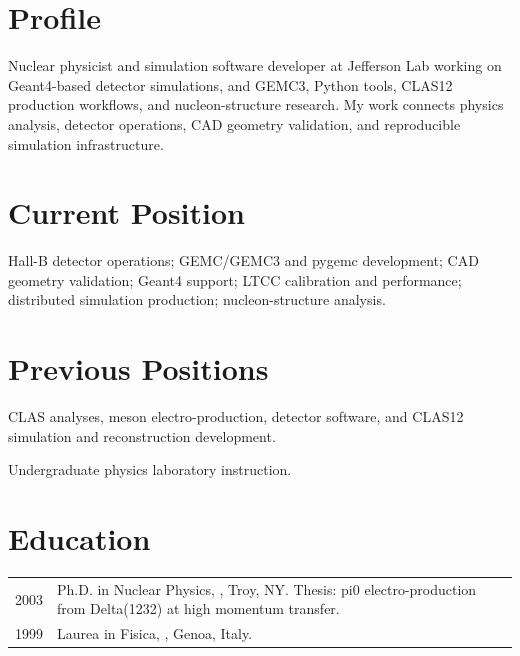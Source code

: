 \documentclass[11pt,letterpaper]{article}
\begin{document}

\section*{Profile}
Nuclear physicist and simulation software developer at Jefferson Lab working on
Geant4-based detector simulations, \MauriGEMC{} and GEMC3, Python tools, CLAS12
production workflows, and nucleon-structure research. My work connects physics
analysis, detector operations, CAD geometry validation, and reproducible
simulation infrastructure.

\section*{Current Position}
{Hall-B detector operations; GEMC/GEMC3 and pygemc development; CAD geometry validation;
Geant4 support; LTCC calibration and performance; distributed simulation production;
nucleon-structure analysis.}

\section*{Previous Positions}
{CLAS analyses, meson electro-production, detector software, and CLAS12 simulation and reconstruction development.}

{Undergraduate physics laboratory instruction.}

\section*{Education}
\begin{tabularx}{\textwidth}{@{}lX@{}}
2003 & Ph.D. in Nuclear Physics, \MauriRPI{}, Troy, NY. Thesis: pi0 electro-production from Delta(1232) at high momentum transfer.\\
1999 & Laurea in Fisica, \MauriUniGe{}, Genoa, Italy.\\
\end{tabularx}
\end{document}
